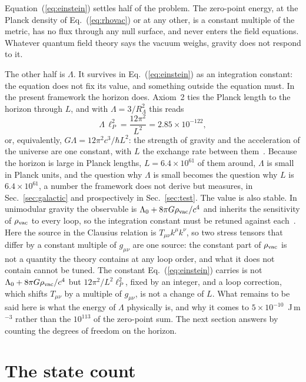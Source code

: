 \documentclass[aps,prd,twocolumn,superscriptaddress,nofootinbib,showkeys]{revtex4-2}
\begin{document}
Equation~(\ref{eq:einstein}) settles half of the problem. The zero-point energy, at the Planck density of Eq.~(\ref{eq:rhovac}) or at any other, is a constant multiple of the metric, has no flux through any null surface, and never enters the field equations. Whatever quantum field theory says the vacuum weighs, gravity does not respond to it.

The other half is $\Lambda$. It survives in Eq.~(\ref{eq:einstein}) as an integration constant: the equation does not fix its value, and something outside the equation must. In the present framework the horizon does. Axiom~2 ties the Planck length to the horizon through $L$, and with $\Lambda = 3/R_\Lambda^2$ this reads
\begin{equation}
\Lambda\,\ell_P^2 = \frac{12\pi^2}{L^2} = 2.85\times10^{-122},
\label{eq:LamL}
\end{equation}
or, equivalently, $G\Lambda = 12\pi^2c^3/\hbar L^2$: the strength of gravity and the acceleration of the universe are one constant, with $L$ the exchange rate between them~\cite{korytko2026}. Because the horizon is large in Planck lengths, $L = 6.4\times10^{61}$ of them around, $\Lambda$ is small in Planck units, and the question why $\Lambda$ is small becomes the question why $L$ is $6.4\times10^{61}$, a number the framework does not derive but measures, in Sec.~\ref{sec:galactic} and prospectively in Sec.~\ref{sec:test}. The value is also stable. In unimodular gravity the observable is $\Lambda_0 + 8\pi G\rho_{\rm vac}/c^4$ and inherits the sensitivity of $\rho_{\rm vac}$ to every loop, so the integration constant must be retuned against each~\cite{padilla2015}. Here the source in the Clausius relation is $T_{\mu\nu}k^\mu k^\nu$, so two stress tensors that differ by a constant multiple of $g_{\mu\nu}$ are one source: the constant part of $\rho_{\rm vac}$ is not a quantity the theory contains at any loop order, and what it does not contain cannot be tuned. The constant Eq.~(\ref{eq:einstein}) carries is not $\Lambda_0 + 8\pi G\rho_{\rm vac}/c^4$ but $12\pi^2/L^2\ell_P^2$, fixed by an integer, and a loop correction, which shifts $T_{\mu\nu}$ by a multiple of $g_{\mu\nu}$, is not a change of $L$. What remains to be said here is what the energy of $\Lambda$ physically is, and why it comes to $5\times10^{-10}$~J\,m$^{-3}$ rather than the $10^{113}$ of the zero-point sum. The next section answers by counting the degrees of freedom on the horizon.

\section{The state count}
\label{sec:count}
\end{document}
